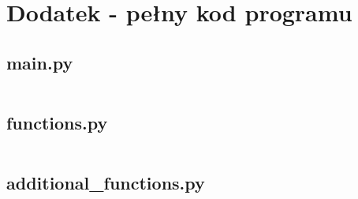 \documentclass[magister]{dyplom}
\begin{document}
\appendixpage
\appendix

\chapter{Dodatek - pełny kod programu}\label{Dod1}

\section{main.py}
\inputminted[breaklines]{python}{the-wallet/main.py}

\section{functions.py}
\inputminted[breaklines]{python}{the-wallet/functions.py}

\section{additional\_functions.py}
\inputminted[breaklines]{python}{the-wallet/additional_functions.py}


\end{document}
